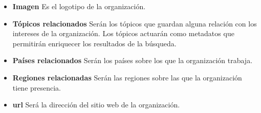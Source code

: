 \begin{description}
\begin{itemize}
							\item \textbf{Imagen}  Es el logotipo de la organización.
							\item \textbf{Tópicos relacionados}  Serán los tópicos que guardan alguna relación con los intereses de la organización.  Los tópicos actuarán como metadatos que permitirán enriquecer los resultados de la búsqueda.
							\item \textbf{Países relacionados}  Serán los países sobre los que la organización trabaja. 
							\item \textbf{Regiones relacionadas}  Serán las regiones sobre las que la organización tiene presencia.
							\item \textbf{url}  Será la dirección del sitio web de la organización.
							\end{itemize}
\end{description}